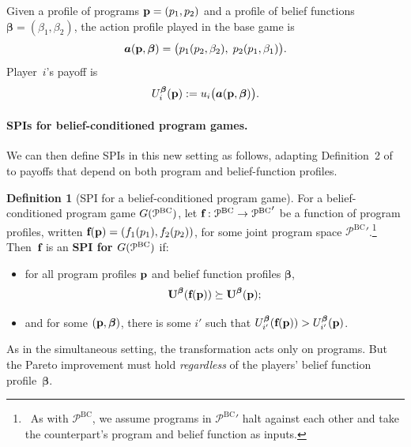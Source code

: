 \documentclass[sigconf]{aamas}
\newcommand{\fullbf}{\boldsymbol{\beta}}
\theoremstyle{definition}
\newtheorem{definition}{Definition} %
\newcommand{\allbcprog}{\mathcal{P}^{\mathrm{BC}}}
\begin{document}
Given a profile of programs $\textbf{p} = (p_1, p_2)$ and a profile of belief functions $\fullbf = (\beta_1, \beta_2)$, the action profile played in the base game is
$$
\fullact(\fullprog, \fullbf) = \bigl(\progone(\progtwo, \beta_2),\; \progtwo(\progone, \beta_1)\bigr).
$$
Player~$i$'s payoff is
$$
\progpayi^{\fullbf}(\fullprog) := \payi\bigl(\fullact(\fullprog, \fullbf)\bigr).
$$

\paragraph{SPIs for belief-conditioned program games.} We can then define SPIs in this new setting as follows, adapting Definition~2 of~\citet{digiovanni2024safe} to payoffs that depend on both program and belief-function profiles.

\begin{definition}[SPI for a belief-conditioned program game]
\label{def:bcpg-spi}
For a belief-conditioned program game $\game(\allbcprog)$,
let $\fullfs : \allbcprog \to {\allbcprog}'$ be a function of program profiles, written $\textbf{f}(\textbf{p}) = (f_1(p_1), f_2(p_2))$, for some joint program space ${\allbcprog}'$.\footnote{\ As with $\allbcprog$, we assume programs in ${\allbcprog}'$ halt against each other and take the counterpart's program and belief function as inputs.}
Then~$\textbf{f}$ is an \textbf{SPI for $\game(\allbcprog)$} if:
\begin{itemize}
    \item for all program profiles $\textbf{p}$ and belief function profiles $\fullbf$,
    $$\fullprogpay^{\fullbf}(\fullfs(\fullprog)) \succeq \fullprogpay^{\fullbf}(\fullprog);$$
    \item and for some $(\fullprog, \fullbf)$, there is some $i'$ such that
    $\progpayip^{\fullbf}(\fullfs(\fullprog)) > \progpayip^{\fullbf}(\fullprog)$.
\end{itemize}
\end{definition}

As in the simultaneous setting, the transformation acts only on programs. But the Pareto improvement must hold \emph{regardless} of the players' belief function profile~$\fullbf$.
\end{document}
